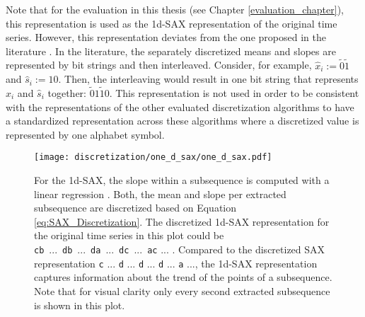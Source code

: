 Note that for the evaluation in this thesis (see Chapter \ref{evaluation_chapter}), this representation is used as the \ac{1d-SAX} representation of the original time series. However, this representation deviates from the one proposed in the literature \cite{1d-SAX}. In the literature, the separately discretized means and slopes are represented by bit strings and then interleaved. Consider, for example, $\hat{x}_i := \tilde{0}\tilde{1}$ and $\hat{s}_i := 10$. Then, the interleaving would result in one bit string that represents $\hat{x}_i$ and $\hat{s}_i$ together: $\tilde{0}1\tilde{1}0$. This representation is not used in order to be consistent with the representations of the other evaluated discretization algorithms to have a standardized representation across these algorithms where a discretized value is represented by one alphabet symbol.
\begin{figure}[htb]
\centering
\texttt{[image: discretization/one\_d\_sax/one\_d\_sax.pdf]}
\caption[1d-Symbolic Aggregate Approximation - Mean \& Slope]{For the \ac{1d-SAX}, the slope within a subsequence is computed with a linear regression \cite{1d-SAX}. Both, the mean and slope per extracted subsequence are discretized based on Equation \ref{eq:SAX_Discretization}. The discretized \ac{1d-SAX} representation for the original time series in this plot could be \mbox{\texttt{c}\texttt{b} ... \texttt{d}\texttt{b} ... \texttt{d}\texttt{a} ... \texttt{d}\texttt{c} ... \texttt{a}\texttt{c}} ... . Compared to the discretized \ac{SAX} representation \texttt{c} ... \texttt{d} ... \texttt{d} ... \texttt{d} ... \texttt{a} ..., the \ac{1d-SAX} representation captures information about the trend of the points of a subsequence. Note that for visual clarity only every second extracted subsequence is shown in this plot.}
\label{fig:1d-SAX}
\end{figure}
